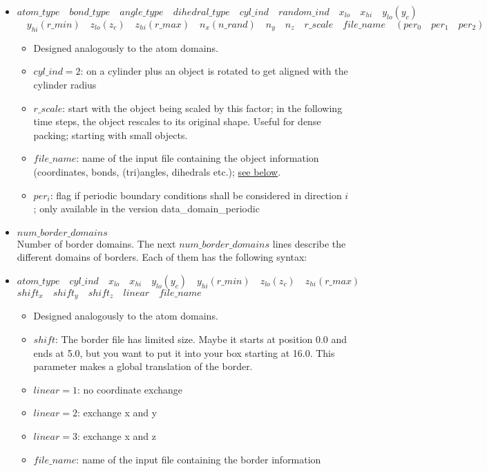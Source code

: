 \begin{itemize}
\item $atom\_type \quad bond\_type \quad angle\_type \quad dihedral\_type \quad cyl\_ind \quad random\_ind \quad x_{lo} \quad x_{hi} \quad y_{lo}(y_c)$\\$\quad y_{hi}(r\_min) \quad z_{lo}(z_c) \quad z_{hi}(r\_max) \quad n_x(n\_rand) \quad n_y \quad n_z \quad r\_scale \quad file\_name \quad \left( per_0 \quad per_1 \quad per_2 \right)$
	\begin{itemize}
	\item Designed analogously to the atom domains.
	\item $cyl\_ind = 2$: on a cylinder plus an object is rotated to get aligned with the cylinder radius
	\item $r\_scale$: start with the object being scaled by this factor; in the following time steps, the object rescales to its original shape. Useful for dense packing; starting with small objects.
	\item $file\_name$: name of the input file containing the object information (coordinates, bonds, (tri)angles, dihedrals etc.); \hyperlink{syn:object_file}{see below}.
	\item $per_i$: flag if periodic boundary conditions shall be considered in direction $i$; only available in the version data\_domain\_periodic
	\end{itemize}

\item $num\_border\_domains$ \\
	{Number of border domains. The next $num\_border\_domains$ lines describe the different domains of borders. Each of them has the following syntax:}

\item $atom\_type \quad cyl\_ind \quad x_{lo} \quad x_{hi} \quad y_{lo}(y_c) \quad y_{hi}(r\_min) \quad z_{lo}(z_c) \quad z_{hi}(r\_max)$\\$shift_x \quad shift_y \quad shift_z \quad linear \quad file\_name$
	\begin{itemize}
	\item Designed analogously to the atom domains.
	\item $shift$: The border file has limited size. Maybe it starts at position 0.0 and ends at 5.0, but you want to put it into your box starting at 16.0. This parameter makes a global translation of the border.
	\item $linear = 1$: no coordinate exchange
	\item $linear = 2$: exchange x and y
	\item $linear = 3$: exchange x and z
	\item $file\_name$: name of the input file containing the border information
	\end{itemize}

\end{itemize}

